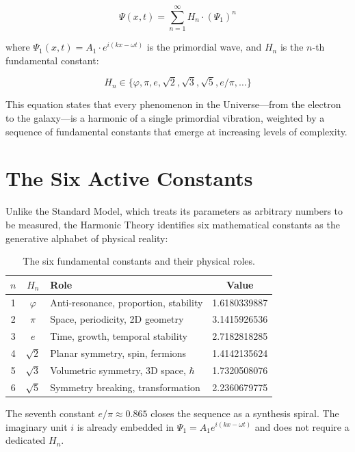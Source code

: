 \documentclass[12pt,a4paper]{article}
\begin{document}
\begin{equation}\label{eq:master}
\Psi(x,t) = \sum_{n=1}^{\infty} H_n \cdot (\Psi_1)^n
\end{equation}

where $\Psi_1(x,t) = A_1 \cdot e^{i(kx - \omega t)}$ is the primordial wave, and $H_n$ is the $n$-th fundamental constant:

\begin{equation}\label{eq:constants}
H_n \in \{\varphi, \pi, e, \sqrt{2}, \sqrt{3}, \sqrt{5}, e/\pi, \ldots\}
\end{equation}

This equation states that every phenomenon in the Universe---from the electron to the galaxy---is a harmonic of a single primordial vibration, weighted by a sequence of fundamental constants that emerge at increasing levels of complexity.

\section{The Six Active Constants}

Unlike the Standard Model, which treats its parameters as arbitrary numbers to be measured, the Harmonic Theory identifies six mathematical constants as the generative alphabet of physical reality:

\begin{table}[h]
\centering
\begin{tabular}{cclc}
\toprule
$n$ & $H_n$ & Role & Value \\
\midrule
1 & $\varphi$ & Anti-resonance, proportion, stability & 1.6180339887 \\
2 & $\pi$   & Space, periodicity, 2D geometry & 3.1415926536 \\
3 & $e$     & Time, growth, temporal stability & 2.7182818285 \\
4 & $\sqrt{2}$ & Planar symmetry, spin, fermions & 1.4142135624 \\
5 & $\sqrt{3}$ & Volumetric symmetry, 3D space, $\hbar$ & 1.7320508076 \\
6 & $\sqrt{5}$ & Symmetry breaking, transformation & 2.2360679775 \\
\bottomrule
\end{tabular}
\caption{The six fundamental constants and their physical roles.}
\end{table}

The seventh constant $e/\pi \approx 0.865$ closes the sequence as a synthesis spiral. The imaginary unit $i$ is already embedded in $\Psi_1 = A_1 e^{i(kx-\omega t)}$ and does not require a dedicated $H_n$.
\end{document}
